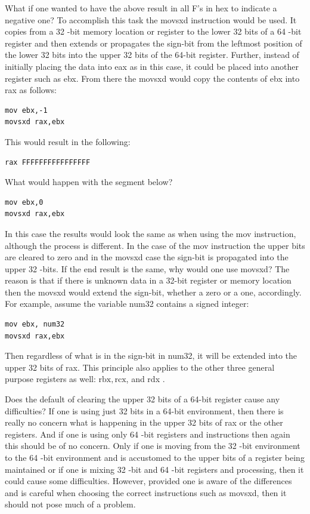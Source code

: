 \documentclass[10pt]{book}
\begin{document}
What if one wanted to have the above result in all F's in hex to indicate a negative one? To accomplish this task the movsxd instruction would be used. It copies from a 32 -bit memory location or register to the lower 32 bits of a 64 -bit register and then extends or propagates the sign-bit from the leftmost position of the lower 32 bits into the upper 32 bits of the 64-bit register. Further, instead of initially placing the data into eax as in this case, it could be placed into another register such as ebx. From there the movsxd would copy the contents of ebx into rax as follows:

\begin{verbatim}
mov ebx,-1
movsxd rax,ebx
\end{verbatim}

This would result in the following:

\begin{verbatim}
rax FFFFFFFFFFFFFFFF
\end{verbatim}

What would happen with the segment below?


\begin{verbatim}
mov ebx,0
movsxd rax,ebx
\end{verbatim}

In this case the results would look the same as when using the mov instruction, although the process is different. In the case of the mov instruction the upper bits are cleared to zero and in the movsxd case the sign-bit is propagated into the upper 32 -bits. If the end result is the same, why would one use movsxd? The reason is that if there is unknown data in a 32-bit register or memory location then the movsxd would extend the sign-bit, whether a zero or a one, accordingly. For example, assume the variable num32 contains a signed integer:

\begin{verbatim}
mov ebx, num32
movsxd rax,ebx
\end{verbatim}

Then regardless of what is in the sign-bit in num32, it will be extended into the upper 32 bits of rax. This principle also applies to the other three general purpose registers as well: $\mathrm{rbx}, \mathrm{rcx}$, and rdx .

Does the default of clearing the upper 32 bits of a 64-bit register cause any difficulties? If one is using just 32 bits in a 64-bit environment, then there is really no concern what is happening in the upper 32 bits of rax or the other registers. And if one is using only 64 -bit registers and instructions then again this should be of no concern. Only if one is moving from the 32 -bit environment to the 64 -bit environment and is accustomed to the upper bits of a register being maintained or if one is mixing 32 -bit and 64 -bit registers and processing, then it could cause some difficulties. However, provided one is aware of the differences and is careful when choosing the correct instructions such as movsxd, then it should not pose much of a problem.
\end{document}
